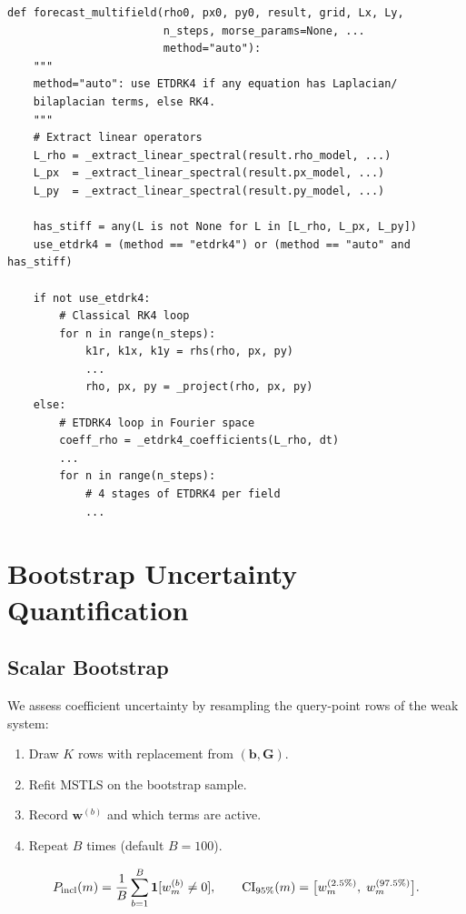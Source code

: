 \documentclass[11pt]{article}
\begin{document}
\begin{lstlisting}[caption={multifield.py --- forecast\_multifield (dispatch)}]
def forecast_multifield(rho0, px0, py0, result, grid, Lx, Ly,
                        n_steps, morse_params=None, ...
                        method="auto"):
    """
    method="auto": use ETDRK4 if any equation has Laplacian/
    bilaplacian terms, else RK4.
    """
    # Extract linear operators
    L_rho = _extract_linear_spectral(result.rho_model, ...)
    L_px  = _extract_linear_spectral(result.px_model, ...)
    L_py  = _extract_linear_spectral(result.py_model, ...)

    has_stiff = any(L is not None for L in [L_rho, L_px, L_py])
    use_etdrk4 = (method == "etdrk4") or (method == "auto" and has_stiff)

    if not use_etdrk4:
        # Classical RK4 loop
        for n in range(n_steps):
            k1r, k1x, k1y = rhs(rho, px, py)
            ...
            rho, px, py = _project(rho, px, py)
    else:
        # ETDRK4 loop in Fourier space
        coeff_rho = _etdrk4_coefficients(L_rho, dt)
        ...
        for n in range(n_steps):
            # 4 stages of ETDRK4 per field
            ...
\end{lstlisting}


\section{Bootstrap Uncertainty Quantification}
\label{sec:bootstrap}

\subsection{Scalar Bootstrap}

We assess coefficient uncertainty by resampling the query-point rows of
the weak system:
\begin{enumerate}
\item Draw $K$ rows with replacement from $(\mathbf{b}, \mathbf{G})$.
\item Refit MSTLS on the bootstrap sample.
\item Record $\mathbf{w}^{(b)}$ and which terms are active.
\item Repeat $B$ times (default $B=100$).
\end{enumerate}

\begin{equation}
  P_{\rm incl}(m) = \frac{1}{B}\sum_{b=1}^B \mathbf{1}[w_m^{(b)} \ne 0],
  \qquad
  \text{CI}_{95\%}(m) = \bigl[w_m^{(2.5\%)},\; w_m^{(97.5\%)}\bigr].
\end{equation}
\end{document}
